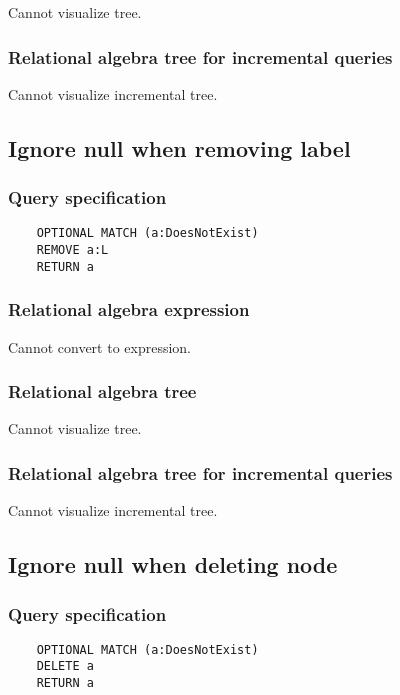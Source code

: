 	Cannot visualize tree.

	\subsubsection*{Relational algebra tree for incremental queries}

	Cannot visualize incremental tree.
	\subsection{Ignore null when removing label}

	\subsubsection*{Query specification}

	\begin{lstlisting}
	OPTIONAL MATCH (a:DoesNotExist)
	REMOVE a:L
	RETURN a
	\end{lstlisting}


	\subsubsection*{Relational algebra expression}

	Cannot convert to expression.

	\subsubsection*{Relational algebra tree}

	Cannot visualize tree.

	\subsubsection*{Relational algebra tree for incremental queries}

	Cannot visualize incremental tree.
	\subsection{Ignore null when deleting node}

	\subsubsection*{Query specification}

	\begin{lstlisting}
	OPTIONAL MATCH (a:DoesNotExist)
	DELETE a
	RETURN a
	\end{lstlisting}



